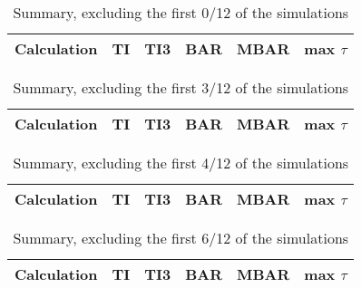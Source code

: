 \documentclass[journal=jctcce,manuscript=article,hyperref=false]{achemso}
\title{}
\begin{document}
\listoffigures
\listoftables




\clearpage
\pagebreak

\begin{table*}
\caption{Summary, excluding the first 0/12 of the simulations}
{\small
\begin{tabular}{l r r r r r}
\hline
                             Calculation &                 TI &                TI3 &                BAR &               MBAR & max $\tau$\\
\hline
\hline
\end{tabular}
}
\end{table*}

\begin{table*}
\caption{Summary, excluding the first 3/12 of the simulations}
{\small
\begin{tabular}{l r r r r r}
\hline
                             Calculation &                 TI &                TI3 &                BAR &               MBAR & max $\tau$\\
\hline
\hline
\end{tabular}
}
\end{table*}

\begin{table*}
\caption{Summary, excluding the first 4/12 of the simulations}
{\small
\begin{tabular}{l r r r r r}
\hline
                             Calculation &                 TI &                TI3 &                BAR &               MBAR & max $\tau$\\
\hline
\hline
\end{tabular}
}
\end{table*}

\begin{table*}
\caption{Summary, excluding the first 6/12 of the simulations}
{\small
\begin{tabular}{l r r r r r}
\hline
                             Calculation &                 TI &                TI3 &                BAR &               MBAR & max $\tau$\\
\hline
\hline
\end{tabular}
}
\end{table*}
\end{document}
